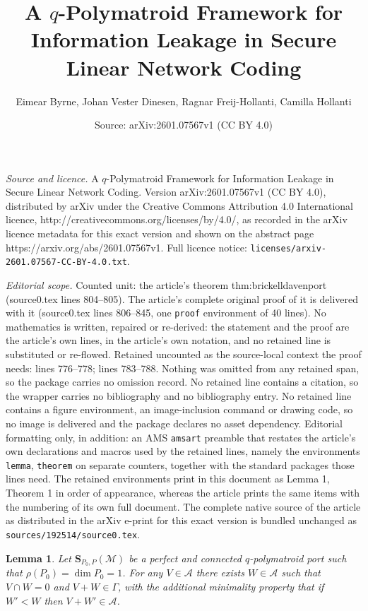 \documentclass[10pt,a4paper]{amsart}
\title{A $q$-Polymatroid Framework for Information Leakage in Secure Linear Network Coding}
\author{Eimear Byrne, Johan Vester Dinesen, Ragnar Freij-Hollanti, Camilla Hollanti}
\date{Source: arXiv:2601.07567v1 (CC BY 4.0)}
\newtheorem{lemma}{Lemma}
\newcommand{\A}{\mathcal{A}}
\renewcommand{\S}{\mathbf{S}}
\begin{document}
\maketitle

\noindent\emph{Source and licence.} A $q$-Polymatroid Framework for Information Leakage in Secure Linear Network Coding. Version arXiv:2601.07567v1 (CC BY 4.0), distributed by arXiv under the Creative Commons Attribution 4.0 International licence, http://creativecommons.org/licenses/by/4.0/, as recorded in the arXiv licence metadata for this exact version and shown on the abstract page https://arxiv.org/abs/2601.07567v1. Full licence notice: \texttt{licenses/arxiv-2601.07567-CC-BY-4.0.txt}.\par\smallskip

\noindent\textit{Editorial scope.} Counted unit: the article's theorem thm:brickelldavenport (source0.tex lines 804--805). The article's complete original proof of it is delivered with it (source0.tex lines 806--845, one \texttt{proof} environment of 40 lines). No mathematics is written, repaired or re-derived: the statement and the proof are the article's own lines, in the article's own notation, and no retained line is substituted or re-flowed.  Retained uncounted as the source-local context the proof needs: lines 776--778; lines 783--788.  Nothing was omitted from any retained span, so the package carries no omission record.  No retained line contains a citation, so the wrapper carries no bibliography and no bibliography entry.  No retained line contains a figure environment, an image-inclusion command or drawing code, so no image is delivered and the package declares no asset dependency.  Editorial formatting only, in addition: an AMS \texttt{amsart} preamble that restates the article's own declarations and macros used by the retained lines, namely the environments \texttt{lemma}, \texttt{theorem} on separate counters, together with the standard packages those lines need.  The retained environments print in this document as Lemma 1, Theorem 1 in order of appearance, whereas the article prints the same items with the numbering of its own full document.  The complete native source of the article as distributed in the arXiv e-print for this exact version is bundled unchanged as \texttt{sources/192514/source0.tex}.
\begin{lemma} Let $\S_{P_0,P}(\mathcal{M})$ be a perfect and connected $q$-polymatroid port such that $\rho(P_0)= \dim P_0 = 1$. For any $V\in \A$ there exists $W\in \A$ such that $V\cap W=0$ and $V+W\in \Gamma$, with the additional minimality property that if $W'<W$ then $V+W'\in \A$.
\label{lem:brickell1}
\end{lemma}
\end{document}
